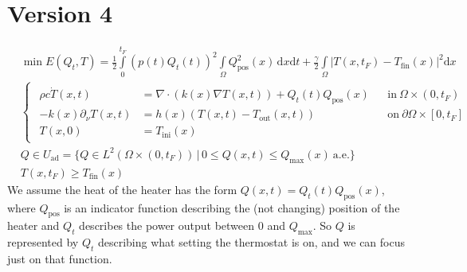 \documentclass[landscape,parskip=half,7pt]{scrartcl}
\begin{document}
	\section{Version 4}
	\begin{align*}
		&\min E(Q_t,T)=\frac12\int\limits_{0}^{t_F}(p(t)Q_t(t))^2\int\limits_\Omega Q_\text{pos}^2(x)\,\mathrm{d}x\mathrm dt +\frac\gamma2\int\limits_\Omega |T(x,t_F)-T_\text{fin}(x)|^2\mathrm dx \\
		&\begin{cases}\begin{aligned}
				\rho c\dot T(x,t)&=\nabla\cdot\left(k(x)\nabla T(x,t)\right)+Q_t(t)Q_\text{pos}(x) && \text{in}\ \Omega\times(0,t_F) \\
				-k(x)\partial_\nu T(x,t)&=h(x)\left(T(x,t)-T_\text{out}(x,t)\right) && \text{on}\ \partial\Omega\times[0,t_F]\\
				T(x,0)&=T_\text{ini}(x)&&
		\end{aligned}\end{cases}\tag{SE}\\
		& Q\in U_\text{ad}=\{Q\in L^2(\Omega\times(0,t_F))\,|\,0\leq Q(x,t)\leq Q_\text{max}(x)\ \text{a.e.}\}\\
		&T(x,t_F)\geq T_\text{fin}(x)
	\end{align*}
	We assume the heat of the heater has the form $Q(x,t)=Q_t(t)Q_\text{pos}(x)$, where $Q_\text{pos}$ is an indicator function describing the (not changing) position of the heater and $Q_t$ describes the power output between $0$ and $Q_\text{max}$. So $Q$ is represented by $Q_t$ describing what setting the thermostat is on, and we can focus just on that function.
\end{document}

